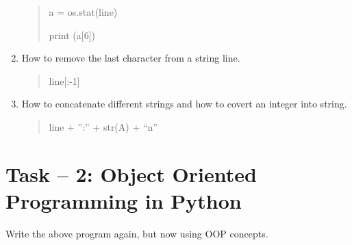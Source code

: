 \documentclass[letterpaper,10pt,english]{sphinxmanual}
\begin{document}
\begin{enumerate}
\begin{quote}
a = os.stat(line)

print (a{[}6{]})
\end{quote}

\item {} 
How to remove the last character from a string line.
\begin{quote}

line{[}:-1{]}
\end{quote}

\item {} 
How to concatenate different strings and how to covert an integer into string.
\begin{quote}

line + '':'' + str(A)  + ``n''
\end{quote}

\end{enumerate}


\section{Task – 2: Object Oriented Programming in Python}
\label{week-08:task-2-object-oriented-programming-in-python}
Write the above program again, but now using OOP concepts.
\end{document}
